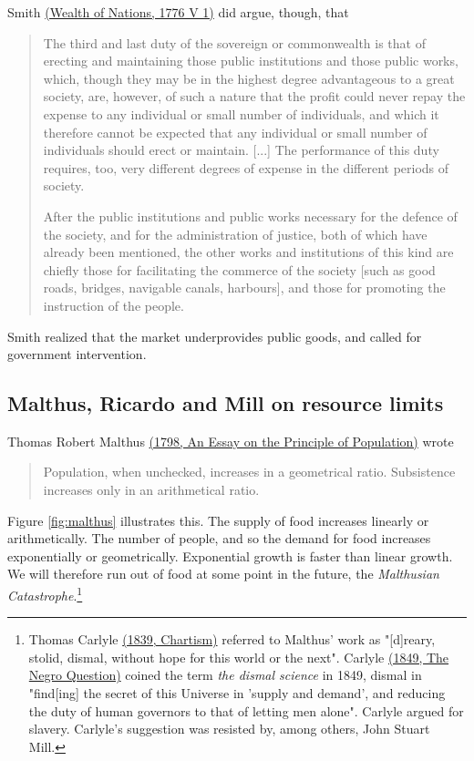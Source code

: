 Smith \href{https://en.wikisource.org/wiki/The_Wealth_of_Nations/Book_V/Chapter_1#Part_3:_Of_the_Expense_of_Public_Works_and_Public_Institutions}{(Wealth of Nations, 1776 V 1)} did argue, though, that
\begin{quote}
    The third and last duty of the sovereign or commonwealth is that of erecting and maintaining those public institutions and those public works, which, though they may be in the highest degree advantageous to a great society, are, however, of such a nature that the profit could never repay the expense to any individual or small number of individuals, and which it therefore cannot be expected that any individual or small number of individuals should erect or maintain. [...] The performance of this duty requires, too, very different degrees of expense in the different periods of society.
    
    After the public institutions and public works necessary for the defence of the society, and for the administration of justice, both of which have already been mentioned, the other works and institutions of this kind are chiefly those for facilitating the commerce of the society [such as good roads, bridges, navigable canals, harbours], and those for promoting the instruction of the people.
\end{quote}
Smith realized that the market underprovides public goods, and called for government intervention.

\subsection{Malthus, Ricardo and Mill on resource limits}
\label{sc:malthus}
Thomas Robert Malthus \href{http://www.esp.org/books/malthus/population/malthus.pdf}{(1798, An Essay on the Principle of Population)} wrote
\begin{quote}
    Population, when unchecked, increases in a geometrical ratio. Subsistence increases only in an arithmetical ratio.
\end{quote}
Figure \ref{fig:malthus} illustrates this. The supply of food increases linearly or arithmetically. The number of people, and so the demand for food increases exponentially or geometrically. Exponential growth is faster than linear growth. We will therefore run out of food at some point in the future, the \emph{Malthusian Catastrophe}.\footnote{Thomas Carlyle \href{https://books.google.co.uk/books?id=UNbMBgAAQBAJ}{(1839, Chartism)} referred to Malthus' work as "[d]reary, stolid, dismal, without hope for this world or the next". Carlyle \href{https://books.google.co.uk/books?id=UNbMBgAAQBAJ}{(1849, The Negro Question)} coined the term \emph{the dismal science} in 1849, dismal in "find[ing] the secret of this Universe in 'supply and demand', and reducing the duty of human governors to that of letting men alone". Carlyle argued for slavery. Carlyle's suggestion was resisted by, among others, John Stuart Mill.}

